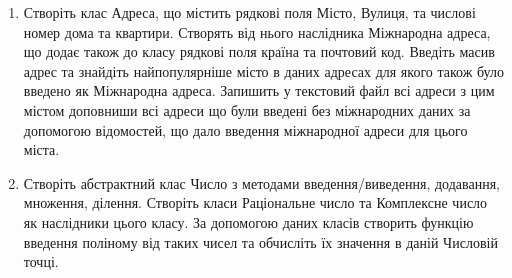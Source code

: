 \documentclass[]{article}
\begin{document}
\begin{enumerate}
\item
Створіть клас Адреса, що містить рядкові поля Місто, Вулиця, та числові номер дома та квартири. 
Створять від нього наслідника Міжнародна адреса, що додає також до класу рядкові поля країна та почтовий код.
Введіть масив адрес та знайдіть найпопулярніше місто в даних адресах для якого також було введено як Міжнародна адреса. 
Запишить у текстовий файл всі адреси з цим містом доповниши всі адреси що були введені без міжнародних даних
за допомогою відомостей, що дало введення міжнародної адреси для цього міста.

\item
Створіть абстрактний клас Число з методами введення/виведення, додавання, множення, ділення.
Створіть класи Раціональне число та Комплексне число як наслідники цього класу. 
За допомогою даних класів створить функцію введення поліному від таких чисел
та обчисліть їх значення в даній Числовій точці.


\end{enumerate}
\end{document}
